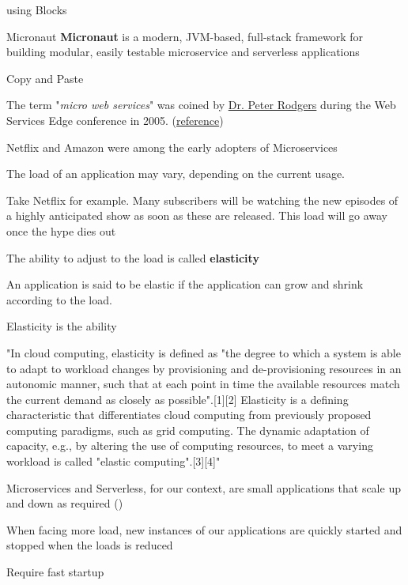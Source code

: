 

\begin{frame}[t]{using Blocks}
  \begin{block}{Micronaut}
    \textbf{Micronaut} is a modern, JVM-based, full-stack framework for building modular, easily testable microservice and serverless applications
  \end{block}
\end{frame}


\begin{frame}[t]{Copy and Paste}

  The term "\textit{micro web services}" was coined by \href{https://www.linkedin.com/in/pjrodgers/}{Dr. Peter Rodgers} during the Web Services Edge conference in 2005. (\href{https://web.archive.org/web/20180520124343/http://www.cloudcomputingexpo.com/node/80883}{reference})


  Netflix and Amazon were among the early adopters of Microservices


  The load of an application may vary, depending on the current usage.

  Take Netflix for example. Many subscribers will be watching the new episodes of a highly anticipated show as soon as these are released. This load will go away once the hype dies out

  The ability to adjust to the load is called \textbf{elasticity}

  An application is said to be elastic if the application can grow and shrink according to the load.

  Elasticity is the ability

  "In cloud computing, elasticity is defined as "the degree to which a system is able to adapt to workload changes by provisioning and de-provisioning resources in an autonomic manner, such that at each point in time the available resources match the current demand as closely as possible".[1][2] Elasticity is a defining characteristic that differentiates cloud computing from previously proposed computing paradigms, such as grid computing. The dynamic adaptation of capacity, e.g., by altering the use of computing resources, to meet a varying workload is called "elastic computing".[3][4]"

  Microservices and Serverless, for our context, are small applications that scale up and down as required ()

  When facing more load, new instances of our applications are quickly started and stopped when the loads is reduced

  Require fast startup

\end{frame}


